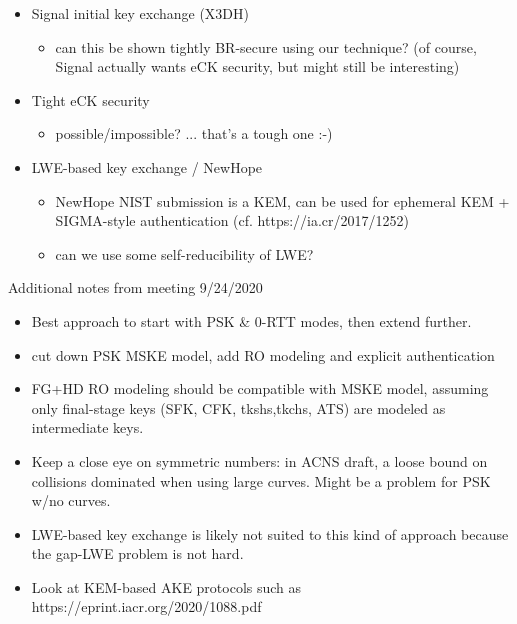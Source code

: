 \begin{itemize}
\item Signal initial key exchange (X3DH)

\begin{itemize}
	\item can this be shown tightly BR-secure using our technique?
(of course, Signal actually wants eCK security, but might still be
interesting)
\end{itemize}
\item Tight eCK security
\begin{itemize}
\item possible/impossible? ... that's a tough one :-)
\end{itemize}
\item LWE-based key exchange / NewHope
\begin{itemize}
\item NewHope NIST submission is a KEM, can be used for ephemeral KEM +
SIGMA-style authentication (cf. https://ia.cr/2017/1252)
\item can we use some self-reducibility of LWE?
\end{itemize}
\end{itemize}

Additional notes from meeting 9/24/2020
\begin{itemize}
	\item Best approach to start with PSK \& 0-RTT modes, then extend further.
	\item cut down PSK MSKE model, add RO modeling and explicit authentication
	\item FG+HD RO modeling should be compatible with MSKE model, assuming only final-stage keys (SFK, CFK, tkshs,tkchs, ATS) are modeled as intermediate keys. 
	\item Keep a close eye on symmetric numbers: in ACNS draft, a loose bound on collisions dominated when using large curves. Might be a problem for PSK w/no curves. 
	\item LWE-based key exchange is likely not suited to this kind of approach because the gap-LWE problem is not hard.
	\item Look at KEM-based AKE protocols such as https://eprint.iacr.org/2020/1088.pdf
\end{itemize}
